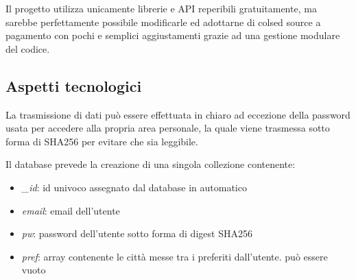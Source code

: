 \vspace{5mm}

Il progetto utilizza unicamente librerie e API reperibili gratuitamente, ma sarebbe perfettamente possibile modificarle ed 
adottarne di colsed source a pagamento con pochi e semplici aggiustamenti grazie ad una gestione modulare del codice.


\subsection{Aspetti tecnologici}

La trasmissione di dati può essere effettuata in chiaro ad eccezione della password usata per accedere alla propria area 
personale, la quale viene trasmessa sotto forma di SHA256 per evitare che sia leggibile.

\vspace{5mm}

Il database prevede la creazione di una singola collezione contenente:
\begin{itemize}
    \item \emph{\_id}: id univoco assegnato dal database in automatico
    \item \emph{email}: email dell'utente 
    \item \emph{pw}: password dell'utente sotto forma di digest SHA256
    \item \emph{pref}: array contenente le città messe tra i preferiti dall'utente. può essere vuoto
\end{itemize}

\vspace{5mm}

